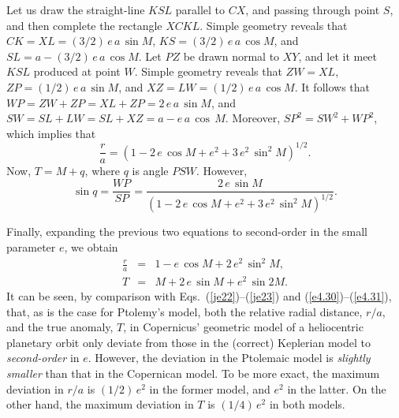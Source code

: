 Let us draw the straight-line $KSL$ parallel to $CX$, and passing through point $S$, and then complete the rectangle $XCKL$. Simple geometry reveals that 
$CK = XL = (3/2)\,e\,a\,\sin M$, $KS=(3/2)\,e\,a\,\cos M$, and  $SL = a-(3/2)\,e\,a\,\cos M$. Let $PZ$ be drawn normal
to $XY$, and let it meet $KSL$ produced at point $W$. Simple geometry reveals that $ZW=XL$,  $ZP=(1/2)\,e\,a\,\sin M$, and $XZ =LW = (1/2)\,e\,a\,\cos M$. It follows that $WP = ZW+ZP = XL+ZP = 2\,e\,a\,\sin M$, and $SW = SL+LW=SL+XZ= a-e\,a\,\cos\,M$.
Moreover, $SP^2 = SW^2+ WP^2$,
which implies that
\begin{equation}
\frac{r}{a} = (1-2\,e\,\cos M +e^2+3\,e^2\,\sin^2 M)^{1/2}.
\end{equation}
Now, $T = M + q$, where $q$ is angle $PSW$. However,
\begin{equation}
\sin q = \frac{WP}{SP} = \frac{2\,e\,\sin M}{(1-2\,e\,\cos M +e^2+3\,e^2\,\sin^2 M)^{1/2}}.
\end{equation}

Finally, expanding the previous two equations to second-order in the small parameter $e$, we obtain
\begin{eqnarray}
\frac{r}{a} &=& 1 -e\,\cos M + 2\,e^2\,\sin^2 M,\\[0.5ex]
T &=& M + 2\,e\,\sin M + e^2\,\sin 2M.
\end{eqnarray}
It can be seen, by comparison with Eqs.~(\ref{je22})--(\ref{je23}) and (\ref{e4.30})--(\ref{e4.31}), that, as is the case for Ptolemy's  model, both the 
relative radial distance, $r/a$,  and the true anomaly, $T$, in Copernicus' geometric model of a heliocentric planetary orbit only deviate from those in the (correct) Keplerian model to {\em second-order}\/ in $e$. However, the deviation  in the Ptolemaic
model is {\em slightly smaller}\/ than that in the Copernican model. To be more exact, the maximum deviation in $r/a$
is $(1/2)\,e^2$ in the former model, and $e^2$ in the latter. On the other hand, the maximum deviation in $T$ is $(1/4)\,e^2$
in both models.